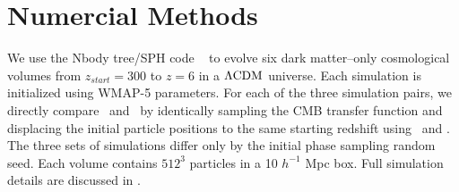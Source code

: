 
%
%

\section{Numercial Methods}
\label{sec:2lpt--methods}






We use the Nbody tree/SPH code \gadgettwo\ \citep{2001NewA....6...79S, 2005MNRAS.364.1105S} to evolve six dark matter--only cosmological volumes from $z_{start} = 300$ to $z = 6$ in a $\rm \Lambda CDM$ universe.  Each simulation is initialized using WMAP-5 \citep{2009ApJS..180..330K} parameters.  For each of the three simulation pairs, we directly compare \lpt\ and \za\ by identically sampling the CMB transfer function and displacing the initial particle positions to the same starting redshift using \lpt\ and \za.  The three sets of simulations differ only by the initial phase sampling random seed.  Each volume contains $512^{3}$ particles in a 10 $h^{-1}$ Mpc box.  Full simulation details are discussed in \citet{2012ApJ...761L...8H}.

